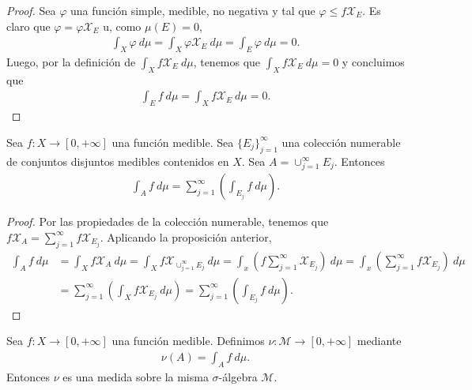\begin{proof}
    Sea $\varphi$ una función simple, medible, no negativa y tal que $\varphi \leq f\mathcal{X}_E$. Es claro que $\varphi = \varphi\mathcal{X}_E$ u, como $\mu(E) = 0$,
    \begin{align*}
        \int_{X}{\varphi \ d\mu} = \int_{X}{\varphi\mathcal{X}_E \ d\mu} = \int_{E}{\varphi \ d\mu} = 0.
    \end{align*}
    Luego, por la definición de $\int_{X}{f \mathcal{X}_E \ d\mu}$, tenemos que $\int_{X}{f\mathcal{X}_E \ d\mu} = 0$ y concluimos que
    \begin{align*}
        \int_{E}{f \ d\mu} = \int_{X}{f\mathcal{X}_E \ d\mu} = 0.
    \end{align*}
\end{proof}

\begin{prop}
    Sea $f: X \longrightarrow [0,+\infty]$ una función medible. Sea $\{ E_j\}_{j=1}^{\infty}$ una colección numerable de conjuntos disjuntos medibles contenidos en $X$. Sea $A = \cup_{j=1}^{\infty}{E_j}$. Entonces
    \begin{align*}
        \int_{A}{f \ d\mu} = \sum_{j=1}^{\infty}{\left( \int_{E_j}{f \ d\mu}\right)}.
    \end{align*}
\end{prop}

\begin{proof}
    Por las propiedades de la colección numerable, tenemos que $f\mathcal{X}_A = \sum_{j=1}^{\infty}{f\mathcal{X}_{E_j}}$. Aplicando la proposición anterior,
    \begin{align*}
        \int_{A}{f \ d\mu} & = \int_{X}{f\mathcal{X}_A \ d\mu} = \int_{X}{f\mathcal{X}_{\cup_{j=1}^{\infty}{E_j}} \ d\mu} = \int_{x}{\left(f\sum_{j=1}^{\infty}{\mathcal{X}_{E_j}}\right) \ d\mu} = \int_{x}{\left(\sum_{j=1}^{\infty}{f\mathcal{X}_{E_j}}\right) \ d\mu} \\
                           & = \sum_{j=1}^{\infty}{\left( \int_{X}{f\mathcal{X}_{E_j} \ d\mu}\right)} = \sum_{j=1}^{\infty}{\left( \int_{E_j}{f \ d\mu}\right)}.
    \end{align*}
\end{proof}

\begin{cor}
    Sea $f:X \longrightarrow [0,+\infty]$ una función medible. Definimos $\nu: \mathcal{M} \longrightarrow [0,+\infty]$ mediante
    \begin{align*}
        \nu(A) = \int_{A}{f \ d\mu}.
    \end{align*}
    Entonces $\nu$ es una medida sobre la misma $\sigma$-álgebra $\mathcal{M}$.
\end{cor}

